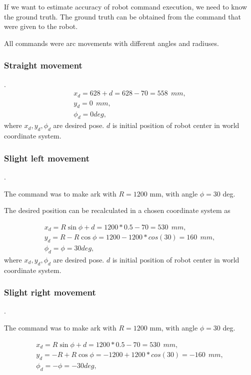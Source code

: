 \documentclass[a4paper, 12pt]{article}
\begin{document}
If we want to estimate accuracy of robot command execution, we need to know the ground truth. The ground truth can be obtained from the command that were given to the robot.

\medskip

All commands were arc movements with different angles and radiuses.

\subsubsection{Straight movement}.
$$
\begin{array}{l}
x_d = 628 +d = 628-70 = 558 ~~mm, \\
y_d = 0 ~~mm, \\
\phi_d = 0 deg,
\end{array}
$$
where $x_d,y_d,\phi_d$ are desired pose. $d$ is initial position of robot center in world coordinate system.

\subsubsection{Slight left movement}.

The command was to make ark with $R = 1200$ mm, with angle $\phi = 30$ deg.

\medskip

The desired position can be recalculated in a chosen coordinate system as


$$
\begin{array}{l}
x_d = R \sin \phi + d = 1200*0.5-70 = 530 ~~mm, \\
y_d = R-R \cos \phi = 1200-1200*cos(30) = 160 ~~mm, \\
\phi_d = \phi =30 deg,
\end{array}
$$
where $x_d,y_d,\phi_d$ are desired pose. $d$ is initial position of robot center in world coordinate system.

\subsubsection{Slight right movement}.

The command was to make ark with $R = 1200$ mm, with angle $\phi = 30$ deg.

\medskip

$$
\begin{array}{l}
x_d = R \sin \phi + d = 1200*0.5-70 = 530 ~~mm, \\
y_d = -R+R \cos \phi = -1200+1200*cos(30) = -160 ~~mm, \\
\phi_d = -\phi = -30 deg,
\end{array}
$$
\end{document}
